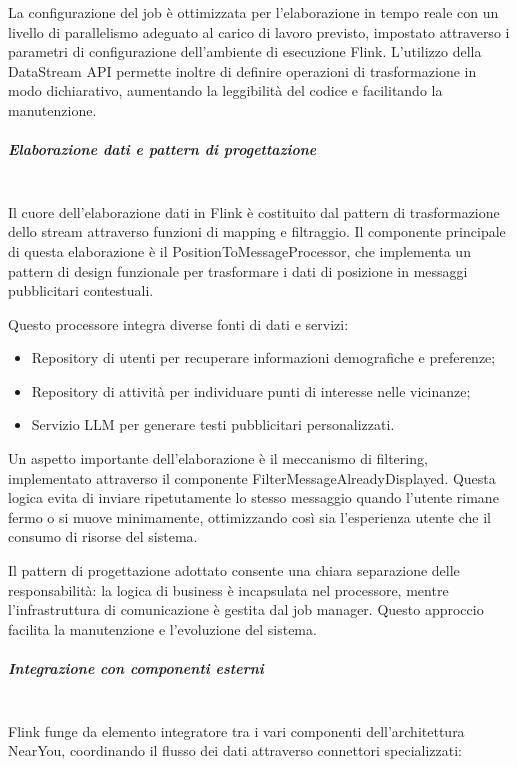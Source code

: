 \documentclass[10pt]{article}
\newcommand{\mysubparagraph}[1]{\subparagraph{#1}\mbox{}\\}
\begin{document}
        La configurazione del job è ottimizzata per l'elaborazione in tempo reale con un livello di parallelismo adeguato al carico di lavoro previsto, impostato attraverso i parametri di configurazione dell'ambiente di esecuzione Flink.
        L'utilizzo della DataStream API permette inoltre di definire operazioni di trasformazione in modo dichiarativo, aumentando la leggibilità del codice e facilitando la manutenzione.

        \mysubparagraph{Elaborazione dati e pattern di progettazione}
        Il cuore dell'elaborazione dati in Flink è costituito dal pattern di trasformazione dello stream attraverso funzioni di mapping e filtraggio.
        Il componente principale di questa elaborazione è il PositionToMessageProcessor, che implementa un pattern di design funzionale per trasformare i dati di posizione in messaggi pubblicitari contestuali.

        Questo processore integra diverse fonti di dati e servizi:
        \begin{itemize}
            \item Repository di utenti per recuperare informazioni demografiche e preferenze;
            \item Repository di attività per individuare punti di interesse nelle vicinanze;
            \item Servizio LLM per generare testi pubblicitari personalizzati.
        \end{itemize}

        Un aspetto importante dell'elaborazione è il meccanismo di filtering, implementato attraverso il componente FilterMessageAlreadyDisplayed. Questa logica evita di inviare ripetutamente lo stesso messaggio quando l'utente rimane fermo o si muove minimamente, ottimizzando così sia l'esperienza utente che il consumo di risorse del sistema.

        Il pattern di progettazione adottato consente una chiara separazione delle responsabilità: la logica di business è incapsulata nel processore, mentre l'infrastruttura di comunicazione è gestita dal job manager. Questo approccio facilita la manutenzione e l'evoluzione del sistema.

        \mysubparagraph{Integrazione con componenti esterni}
        Flink funge da elemento integratore tra i vari componenti dell'architettura NearYou, coordinando il flusso dei dati attraverso connettori specializzati:
\end{document}
